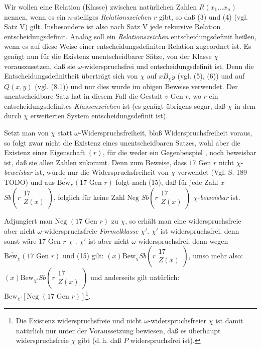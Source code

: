 \documentclass[draft]{scrartcl}
\let\oldleft\left
\let\oldright\right
\def\left#1{%
	    \global\advance\bracketnum1\relax 
		\colorlet{temp}{.}%
		    \csname bracketcolor\the\bracketnum\endcsname
			\oldleft#1%
			    \color{temp}%
	}
\def\right#1{%
	    \colorlet{temp}{.}%
		\csname bracketcolor\the\bracketnum\endcsname
		    \oldright#1%
			\global\advance\bracketnum-1\relax
			    \color{temp}%
	}
\def\left#1{#1}
\def\right#1{#1}
\begin{document}
Wir wollen eine Relation (Klasse) zwischen natürlichen Zahlen $R\left(x_1 \dots x_n\right)$ 
 nennen, wenn es ein $n$-stelliges \textit{Relationszeichen} $r$ gibt, 
so daß (3) und (4) (vgl. Satz V) gilt.
Insbesondere ist also nach Satz V jede rekursive Relation
entscheidungsdefinit. Analog soll ein \textit{Relationszeichen} entscheidungsdefinit
 heißen, wenn es auf diese Weise einer entscheidungsdefiniten Relation zugeordnet ist. 
Es genügt nun für die Existenz unentscheidbarer Sätze, von der Klasse $\chi$ vorauszusetzen, 
daß sie $\omega$-widerspruchsfrei und entscheidungsdefinit ist. Denn die 
Entscheidungsdefinitheit überträgt sich von $\chi$ auf $x B_\chi y$ (vgl. (5), (6)) und 
auf $Q\left(x, y\right)$ (vgl. (8.1)) und nur dies wurde im obigen Beweise verwendet.
Der unentscheidbare Satz hat in diesem Fall die Gestalt $v\text{ Gen } r$, wo $r$ ein 
entscheidungsdefinites \textit{Klassenzeichen} ist (es genügt übrigens sogar, 
daß $\chi$ in dem durch $\chi$ erweiterten System entscheidungsdefinit ist).

Setzt man von $\chi$ statt $\omega$-Widerspruchsfreiheit, bloß 
Widerspruchsfreiheit voraus, so folgt zwar nicht die Existenz
 eines unentscheidbaren Satzes, wohl aber die Existenz einer 
Eigenschaft $\left(r\right)$, für die weder ein Gegenbeispiel 
, noch beweisbar ist, daß sie allen Zahlen zukommt. 
Denn zum Beweise, dass $17\text{ Gen } r$ nicht 
$\chi$-\textit{beweisbar} ist, wurde nur die Widerspruchsfreiheit 
von $\chi$ verwendet (Vgl. S. 189 TODO) und aus
 $\overline{\text{Bew}_\chi}\left(17\text{ Gen } r\right)$ folgt
nach (15), daß für jede Zahl $x$ 
$Sb\left(r\substack{17\\ Z\left(x\right)}\right)$, folglich für
 keine Zahl $\text{Neg }Sb\left(r\substack{17\\ Z\left(x\right)}\right)$ $\chi$-\textit{beweisbar} ist.

Adjungiert man $\text{Neg }\left(17 \text{ Gen } r\right)$ zu $\chi$,
so erhält man eine widerspruchsfreie aber nicht $\omega$-widerspruchsfreie 
\textit{Formelklasse} $\chi'$. $\chi'$ ist widerspruchsfrei, denn sonst wäre 
$17 \text{ Gen } r$ $\chi$-.
$\chi'$ ist aber nicht $\omega$-widerspruchsfrei, denn wegen 
$\overline{\text{Bew}_\chi}\left(17\text{ Gen } r\right)$ und (15) gilt: 
$\left(x\right) \text{Bew}_\chi Sb\left(r\substack{17\\ Z\left(x\right)}\right)$, umso mehr also:
$\left(x\right)\text{Bew}_{\chi'} Sb\left(r\substack{17\\ Z\left(x\right)}\right)$ 
und anderseits gilt natürlich: 
$\text{Bew}_{\chi'}\left[\text{Neg }\left(17\text{ Gen }r\right)\right]$\footnote{Die Existenz 
widerspruchsfreie und nicht $\omega$-widerspruchsfreier $\chi$ ist damit natürlich nur 
unter der Voraussetzung bewiesen, daß es überhaupt widerspruchsfreie 
$\chi$ gibt (d.\,h. daß $P$ widerspruchsfrei ist).}.
\end{document}
